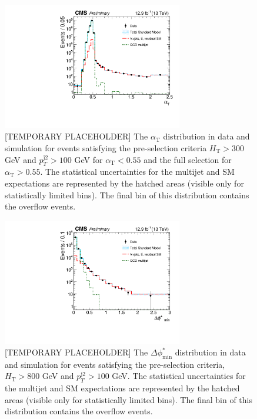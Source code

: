 \clearpage
\begin{figure}[p]
    \caption{ 
	[TEMPORARY PLACEHOLDER]
    The $\alpha_{\mathrm{T}}$ distribution in data and simulation for events satisfying the
	pre-selection criteria $H_{\mathrm{T}} > 300$ GeV and
	$p_{T}^{\mathrm{j2}} > 100$ GeV for $\alpha_{\mathrm{T}} < 0.55$ and
	the full selection for $\alpha_{\mathrm{T}} > 0.55$.
	The statistical uncertainties for the multijet and SM expectations are represented by the hatched areas (visible only for statistically limited bins).
	 The final bin of this distribution contains the overflow events.
    \label{fig:alphaT} }
  \begin{center}
  \includegraphics[width=0.7\textwidth]{Supplementary/CMS-SUS-16-038_Figure-aux_008}
  \end{center}
\end{figure}


\begin{figure}[p]
    \caption{ 
	[TEMPORARY PLACEHOLDER]
    The $\Delta\phi^{*}_{\mathrm{min}}$ distribution in data and simulation for events
	satisfying the pre-selection criteria, $H_{\mathrm{T}} > 800$ GeV and
	$p_{T}^{\mathrm{j2}} > 100$ GeV. 
	The statistical uncertainties for the multijet and SM expectations are represented by the hatched areas (visible only for statistically limited bins).
	 The final bin of this distribution contains the overflow events.
    \label{fig:bDPhi} }
  \begin{center}
  \includegraphics[width=0.7\textwidth]{Supplementary/CMS-SUS-16-038_Figure-aux_009}
  \end{center}
\end{figure}


